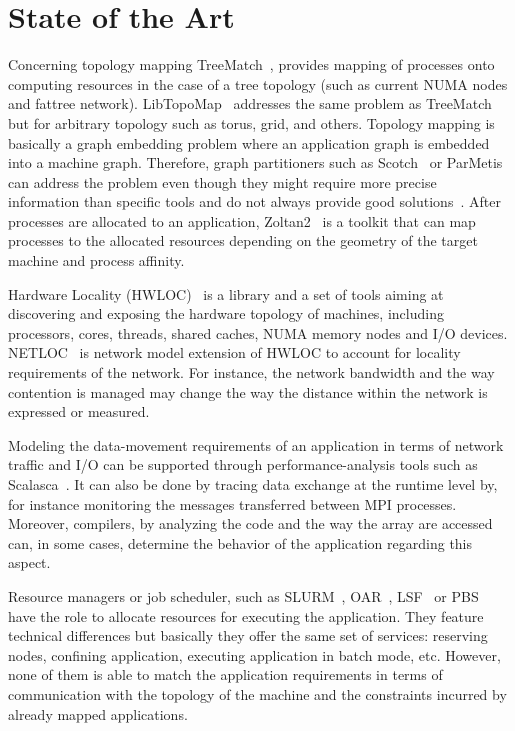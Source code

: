 \section{State of the Art}
Concerning topology mapping TreeMatch~\cite{jmt14b}, provides mapping
of processes onto computing resources in the case of a tree topology (such as
current NUMA nodes and fattree
network). LibTopoMap~\cite{DBLP:conf/ics/HoeflerS11} addresses the same problem as
TreeMatch but for arbitrary topology such as torus, grid, and others. Topology mapping is basically a graph embedding problem 
where an application graph is embedded into a machine graph.  Therefore, graph partitioners 
such as Scotch~\cite{scotch-man} or ParMetis~\cite{karypis2003parmetis} can address the
problem even though they might require more precise information than specific
tools and do not always provide good solutions~\cite{jmt14b}.  
After processes are allocated to an application, Zoltan2~\cite{zoltan2,drl+14} is a 
toolkit that can map processes to the allocated resources depending on the geometry of the 
target machine and process affinity.


Hardware Locality (HWLOC)~\cite{hwloc} is a library and a set of tools aiming at
discovering and exposing the hardware topology of machines, including
processors, cores, threads, shared caches, NUMA memory nodes and I/O devices.
NETLOC~\cite{netloc} is network model extension of HWLOC to account for locality
requirements of the network. For instance, the network bandwidth and the way
contention is managed may change the way the distance within the network is
expressed or measured. 

Modeling the data-movement requirements of an application in terms of
network traffic and I/O can be supported through performance-analysis tools
such as Scalasca~\cite{geimer_ea:2010:scalascaarchitecture}. It can also be done
by tracing data exchange at the runtime level by, for instance monitoring the
messages transferred between MPI processes. Moreover, compilers, by analyzing
the code and the way the array are accessed can, in some cases, determine the
behavior of the application regarding this aspect. 

Resource managers or job scheduler, such as SLURM~\cite{yoo2003slurm},
OAR~\cite{capit2005batch,}, LSF~\cite{zhou1992lsf}
or PBS~\cite{henderson1995job} have the role to allocate resources for executing the
application. They feature technical differences but basically they offer the
same set of services: reserving nodes, confining application, executing
application in batch mode, etc. However, none of them is able to match the
application requirements in terms of communication with the topology of the
machine and the constraints incurred by already mapped applications. 



